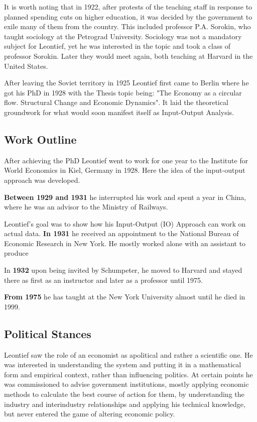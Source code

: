 \documentclass[12pt,a4paper]{scrartcl}
\begin{document}
	It is worth noting that in 1922, after protests of the teaching staff in response to planned spending cuts on higher education, it was decided by the government to exile many of them from the country. This included professor P.A. Sorokin, who taught sociology at the Petrograd University. Sociology was not a mandatory subject for Leontief, yet he was interested in the topic and took a class of professor Sorokin. Later they would meet again, both teaching at Harvard in the United States. \cite[p.353]{Kaliadina2006}
	
	After leaving the Soviet territory in 1925 Leontief first came to Berlin where he got his PhD in 1928 with the Thesis topic being: "The Economy as a circular flow. Structural Change and Economic Dynamics". It laid the theoretical groundwork for what would soon manifest itself as Input-Output Analysis.
	
	\subsection{Work Outline}
	
	After achieving the PhD Leontief went to work for one year to the Institute for World Economics in Kiel, Germany in 1928. Here the idea of the input-output approach was developed.
	
	\textbf{Between 1929 and 1931} he interrupted his work and spent a year in China, where he was an advisor to the Ministry of Railways.
	
	Leontief's goal was to show how his Input-Output (IO) Approach can work on actual data.	\textbf{In 1931} he received an appointment to the National Bureau of Economic Research in New York. He mostly worked alone with an assistant to produce
	
	In \textbf{1932} upon being invited by Schumpeter, he moved to Harvard and stayed there as first as an instructor and later as a professor until 1975. 
	
	\textbf{From 1975} he has taught at the New York University almost until he died in 1999.
		
	\subsection{Political Stances}
	
	Leontief saw the role of an economist as apolitical and rather a scientific one. He was interested in understanding the system and putting it in a mathematical form and empirical context, rather than influencing politics. At certain points he was commissioned to advise government institutions, mostly applying economic methods to calculate the best course of action for them, by understanding the industry and interindustry relationships and applying his technical knowledge, but never entered the game of altering economic policy. \cite[p.21]{Hamilton2008}
	
\end{document}

